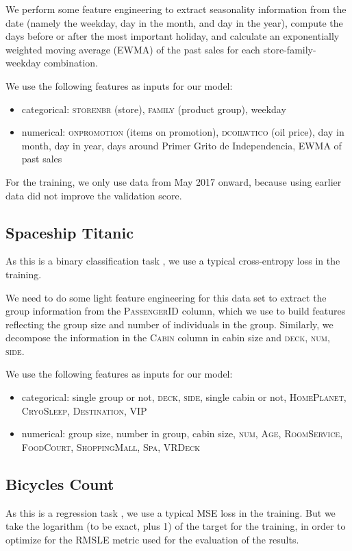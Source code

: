 \documentclass{article}
\begin{document}
We perform some feature engineering to extract seasonality information from the date (namely the weekday, day in the month, and day in the year), compute the days before or after the most important holiday, and calculate an exponentially weighted moving average (EWMA) of the past sales for each store-family-weekday combination.

We use the following features as inputs for our model:
\begin{itemize}
\item categorical: \textsc{store}\textunderscore\textsc{nbr} (store), \textsc{family} (product group), weekday
\item numerical: \textsc{onpromotion} (items on promotion), \textsc{dcoilwtico} (oil price), day in month, day in year, days around Primer Grito de Independencia, EWMA of past sales
\end{itemize}

For the training, we only use data from May 2017 onward, because using earlier data did not improve the validation score.

\subsection{Spaceship Titanic}
\label{sec:titanic}
As this is a binary classification task \cite{spaceship-titanic}, we use a typical cross-entropy loss in the training.

We need to do some light feature engineering for this data set to extract the group information from the \textsc{PassengerID} column, which we use to build features reflecting the group size and number of individuals in the group. Similarly, we decompose the information in the \textsc{Cabin} column in cabin size and \textsc{deck}, \textsc{num}, \textsc{side}.

We use the following features as inputs for our model:
\begin{itemize}
\item categorical: single group or not, \textsc{deck}, \textsc{side}, single cabin or not, \textsc{HomePlanet}, \textsc{CryoSleep}, \textsc{Destination}, \textsc{VIP}
\item numerical: group size, number in group, cabin size, \textsc{num}, \textsc{Age}, \textsc{RoomService}, \textsc{FoodCourt}, \textsc{ShoppingMall}, \textsc{Spa}, \textsc{VRDeck}
\end{itemize}

\subsection{Bicycles Count}
\label{sec:bicycles-count}
As this is a regression task \cite{bicycles-count}, we use a typical MSE loss in the training. But we take the logarithm (to be exact, plus 1) of the target for the training, in order to optimize for the RMSLE metric used for the evaluation of the results.
\end{document}

